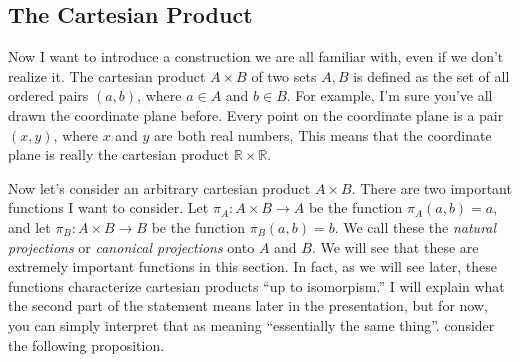\documentclass[11pt, letterpaper]{article}
\begin{document}
\subsection{The Cartesian Product}

Now I want to introduce a construction we are all familiar with, even if we don't realize it. The cartesian product $A\times B$ of two sets $A,B$ is defined as the set of all ordered pairs $(a,b)$, where $a\in A$ and $b\in B$. For example, I'm sure you've all drawn the coordinate plane before. Every point on the coordinate plane is a pair $(x,y)$, where $x$ and $y$ are both real numbers, This means that the coordinate plane is really the cartesian product $\mathbb{R} \times \mathbb{R} $.

Now let's consider an arbitrary cartesian product $A\times B$. There are two important functions I want to consider. Let $\pi _A : A\times B \to A$ be the function $\pi_A(a,b)=a$, and let $\pi _B : A\times B \to B$ be the function $\pi _B(a,b)=b$. We call these the \emph{natural projections} or \emph{canonical projections} onto $A$ and $B$. We will see that these are extremely important functions in this section. In fact, as we will see later, these functions characterize cartesian products ``up to isomorpism.'' I will explain what the second part of the statement means later in the presentation, but for now, you can simply interpret that as meaning ``essentially the same thing''. consider the following proposition.
\end{document}
